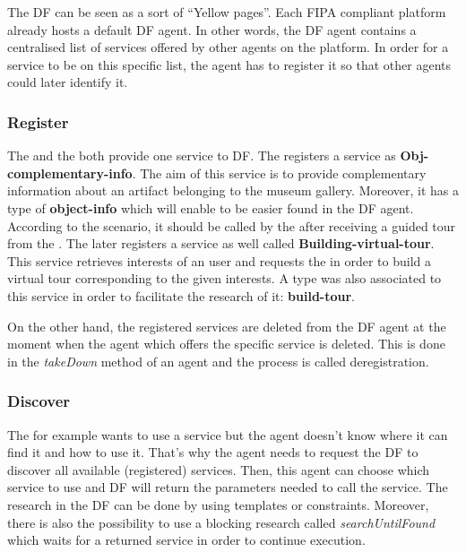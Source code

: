 \documentclass[a4paper,11pt]{article}
\begin{document}
  The DF can be seen as a sort of ``Yellow pages''. Each FIPA compliant platform already hosts a default DF agent. In other words, the DF agent
  contains a centralised list of services offered by other agents on the platform. In order for a service to be on this specific list, 
  the agent has to register it so that other agents could later identify it.
  
  \subsubsection{Register} %
  The \cu{} and the \to{} both provide one service to DF. The \cu{} registers a service as \textbf{Obj-complementary-info}.
  The aim of this service is to provide complementary information about an artifact belonging to the museum gallery. Moreover, it has a type
  of \textbf{object-info} which will enable to be easier found in the DF agent. According to the scenario, it should be called 
  by the \pa{} after receiving a guided tour from the \to{}. The later registers a service as well called \textbf{Building-virtual-tour}. 
  This service retrieves interests of an user and requests the \cu{} in order to build a virtual tour corresponding to the given interests.
  A type was also associated to this service in order to facilitate the research of it: \textbf{build-tour}.
  
  On the other hand, the registered services are deleted from the DF agent at the moment when the agent which offers the specific service is deleted.
  This is done in the \textit{takeDown} method of an agent and the process is called deregistration.
  
  \subsubsection{Discover} %
  The \pa{} for example wants to use a service but the agent doesn't know where it can find it and how to use it. That's why the agent needs 
  to request the DF to discover all available (registered) services. Then, this agent can choose which service to use and DF will 
  return the parameters needed to call the service. The research in the DF can be done by using templates or constraints. Moreover,
  there is also the possibility to use a blocking research called \textit{searchUntilFound} which waits for a returned service in order to continue execution.
  
\end{document}
